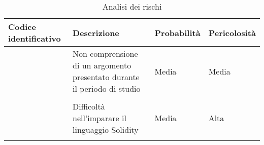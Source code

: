 \begin{longtabu}{|X[1,c]|X[2,c]|X[0.8,c,m]|X[0.8,c,m]|}

  \hline

  \textbf{Codice identificativo} & \textbf{Descrizione} & \textbf{Probabilità} & \textbf{Pericolosità} \\

  \hline

   & Non comprensione di un argomento presentato durante il periodo di studio & Media & Media \\

  \hline

   & & &  \\

  \hline

   & Difficoltà nell'imparare il linguaggio Solidity & Media & Alta \\

  \hline

  \caption{Analisi dei rischi}
\end{longtabu}
